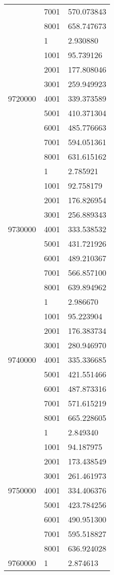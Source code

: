 \begin{table}[htb!]
\begin{tabular}{lll}
 & 7001 & 570.073843 \\
 & 8001 & 658.747673 \\
\multirow[c]{9}{*}{9720000} & 1 & 2.930880 \\
 & 1001 & 95.739126 \\
 & 2001 & 177.808046 \\
 & 3001 & 259.949923 \\
 & 4001 & 339.373589 \\
 & 5001 & 410.371304 \\
 & 6001 & 485.776663 \\
 & 7001 & 594.051361 \\
 & 8001 & 631.615162 \\
\multirow[c]{9}{*}{9730000} & 1 & 2.785921 \\
 & 1001 & 92.758179 \\
 & 2001 & 176.826954 \\
 & 3001 & 256.889343 \\
 & 4001 & 333.538532 \\
 & 5001 & 431.721926 \\
 & 6001 & 489.210367 \\
 & 7001 & 566.857100 \\
 & 8001 & 639.894962 \\
\multirow[c]{9}{*}{9740000} & 1 & 2.986670 \\
 & 1001 & 95.223904 \\
 & 2001 & 176.383734 \\
 & 3001 & 280.946970 \\
 & 4001 & 335.336685 \\
 & 5001 & 421.551466 \\
 & 6001 & 487.873316 \\
 & 7001 & 571.615219 \\
 & 8001 & 665.228605 \\
\multirow[c]{9}{*}{9750000} & 1 & 2.849340 \\
 & 1001 & 94.187975 \\
 & 2001 & 173.438549 \\
 & 3001 & 261.461973 \\
 & 4001 & 334.406376 \\
 & 5001 & 423.784256 \\
 & 6001 & 490.951300 \\
 & 7001 & 595.518827 \\
 & 8001 & 636.924028 \\
\multirow[c]{9}{*}{9760000} & 1 & 2.874613 \\

\end{tabular}
\end{table}
